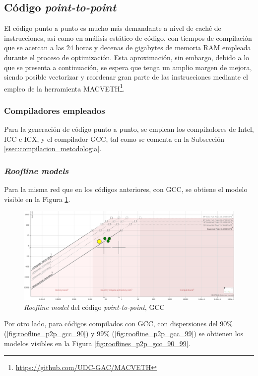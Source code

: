 \subsection{Código \textit{point-to-point}}
El código punto a punto es mucho más demandante a nivel de caché de instrucciones, así como en análisis estático de código, con tiempos de compilación que se acercan a las 24 horas y decenas de gigabytes de memoria RAM empleada durante el proceso de optimización. Esta aproximación, sin embargo, debido a lo que se presenta a continuación, se espera que tenga un amplio margen de mejora, siendo posible vectorizar y reordenar gran parte de las instrucciones mediante el empleo de la herramienta MACVETH\footnote{\url{https://github.com/UDC-GAC/MACVETH}}.

\subsubsection{Compiladores empleados}
Para la generación de código punto a punto, se emplean los compiladores de Intel, ICC e ICX, y el compilador GCC, tal como se comenta en la Subsección \ref{ssec:compilacion_metodologia}.

\subsubsection{\textit{Roofline models}}
Para la misma red que en los códigos anteriores, con GCC, se obtiene el modelo visible en la Figura \ref{fig:roofline_p2p_gcc}.
\begin{figure}[h!]
    \centering
    \includegraphics[width=\textwidth]{img/rooflines/roofline_p2p_95.png}
    \caption{\textit{Roofline model} del código \textit{point-to-point}, GCC}
    \label{fig:roofline_p2p_gcc}
\end{figure}

Por otro lado, para códigos compilados con GCC, con dispersiones del 90\% (\ref{fig:roofline_p2p_gcc_90}) y 99\% (\ref{fig:roofline_p2p_gcc_99}) se obtienen los modelos visibles en la Figura \ref{fig:rooflines_p2p_gcc_90_99}.

